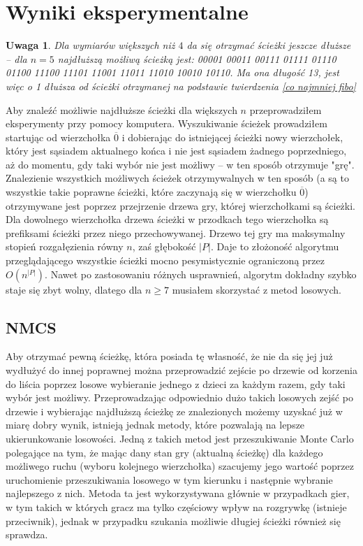 \documentclass{pracamgr}
\newtheorem{remark}[theorem]{Uwaga}
\begin{document}
   \section{Wyniki eksperymentalne}
    \begin{remark}\label{da sie dluzsze}
     Dla wymiarów większych niż $4$ da się otrzymać ścieżki jeszcze dłuższe -- dla $n=5$ najdłuższą możliwą ścieżką jest:
     00001
     00011
     00111
     01111
     01110
     01100
     11100
     11101
     11001
     11011
     11010
     10010
     10110.\newline
     Ma ona długość 13, jest więc o 1 dłuższa od ścieżki otrzymanej na podstawie twierdzenia \ref{co najmniej fibo}
    \end{remark}
    Aby znaleźć możliwie najdłuższe ścieżki dla większych $n$ przeprowadziłem eksperymenty przy pomocy komputera.
    Wyszukiwanie ścieżek prowadziłem startując od wierzchołka $\overline{0}$ i dobierając do istniejącej ścieżki nowy wierzchołek,
    który jest sąsiadem aktualnego końca i nie jest sąsiadem żadnego poprzedniego, aż do momentu, gdy taki wybór nie jest możliwy 
    -- w ten sposób otrzymuje "grę". Znalezienie wszystkich możliwych ścieżek otrzymywalnych w ten sposób
    (a są to wszystkie takie poprawne ścieżki, które zaczynają się w wierzchołku $\overline{0}$) otrzymywane jest poprzez przejrzenie
    drzewa gry, której wierzchołkami są ścieżki. Dla dowolnego wierzchołka drzewa ścieżki w przodkach tego wierzchołka są prefiksami ścieżki
    przez niego przechowywanej. Drzewo tej gry ma maksymalny stopień rozgałęzienia równy $n$, zaś głębokość $|P|$.\newline
    Daje to złożoność algorytmu przeglądającego wszystkie ścieżki mocno pesymistycznie ograniczoną przez $O(n^{|P|})$. Nawet po zastosowaniu
    różnych usprawnień, algorytm dokładny szybko staje się zbyt wolny, dlatego dla $n\ge7$ musiałem skorzystać z metod losowych.
    \subsection{NMCS}
     Aby otrzymać pewną ścieżkę, która posiada tę własność, że nie da się jej już wydłużyć do innej poprawnej można przeprowadzić zejście po drzewie
     od korzenia do liścia poprzez losowe wybieranie jednego z dzieci za każdym razem, gdy taki wybór jest możliwy.\newline
     Przeprowadzając odpowiednio dużo takich losowych zejść po drzewie i wybierając najdłuższą ścieżkę ze znalezionych możemy uzyskać już w miarę dobry
     wynik, istnieją jednak metody, które pozwalają na lepsze ukierunkowanie losowości.\newline
     Jedną z takich metod jest przeszukiwanie Monte Carlo polegające na tym, że mając dany stan gry (aktualną ścieżkę) dla każdego możliwego ruchu
     (wyboru kolejnego wierzchołka) szacujemy jego wartość poprzez uruchomienie przeszukiwania losowego w tym kierunku i następnie wybranie najlepszego z nich.
     Metoda ta jest wykorzystywana głównie w przypadkach gier, w tym takich w których gracz ma tylko częściowy wpływ na rozgrywkę (istnieje przeciwnik),
     jednak w przypadku szukania możliwie długiej ścieżki również się sprawdza.
     
\end{document}
